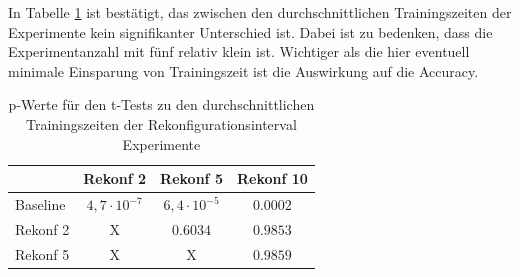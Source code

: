  
 In Tabelle \ref{tab:reconf} ist bestätigt, das zwischen den durchschnittlichen Trainingszeiten der Experimente kein signifikanter Unterschied ist. Dabei ist zu bedenken, dass die Experimentanzahl mit fünf relativ klein ist. Wichtiger als die hier eventuell minimale Einsparung von Trainingszeit ist die Auswirkung auf die Accuracy.
 


\begin{table}[]
\caption{p-Werte für den t-Tests zu den durchschnittlichen Trainingszeiten der Rekonfigurationsinterval Experimente }
\centering
\begin{tabular}{l|c|c|c|}
\cline{2-4}
                                & \multicolumn{1}{l|}{Rekonf 2}     & \multicolumn{1}{l|}{Rekonf 5}     & \multicolumn{1}{l|}{Rekonf 10}    \\ \hline
\multicolumn{1}{|l|}{Baseline}  & \cellcolor[HTML]{FFFFFF}$4,7\cdot 10^{-7}$ & \cellcolor[HTML]{FFFFFF}$6,4\cdot 10^{-5}$ & \cellcolor[HTML]{FFFFFF}$0.0002$ \\ \hline
\multicolumn{1}{|l|}{Rekonf 2}  & X                                 & \cellcolor[HTML]{FE0000}$0.6034$    & \cellcolor[HTML]{FE0000}$0.9853$    \\ \hline
\multicolumn{1}{|l|}{Rekonf 5}  & X                                 & X                                 & \cellcolor[HTML]{FE0000}$0.9859$    \\ \hline
\end{tabular}
\label{tab:reconf}
\end{table}
 
